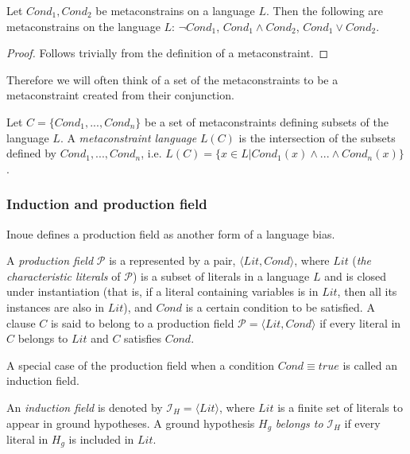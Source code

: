 \begin{proposition}
Let $Cond_1, Cond_2$ be metaconstrains on a language $L$.
Then the following are metaconstrains on the language $L$:
$\neg Cond_1$, $Cond_1 \land Cond_2$, $Cond_1 \lor Cond_2$.
\end{proposition}

\begin{proof}
Follows trivially from the definition of a metaconstraint.
\end{proof}

Therefore we will often think of a set of the metaconstraints to be a metaconstraint created from their conjunction.

\begin{defn}
Let $C=\{Cond_1, ..., Cond_n\}$ be a set of metaconstraints defining subsets of the language $L$.
A \emph{metaconstraint language} $L(C)$ is the intersection of the subsets defined by $Cond_1, ..., Cond_n$,
i.e. $L(C)=\{x \in L | Cond_1(x) \land ... \land Cond_n(x) \}$.
\end{defn}

\subsubsection{Induction and production field}
Inoue defines a production field as another form of a language bias.

\begin{defn}\cite{inoue2004induction}
A \emph{production field} $\mathcal{P}$ is a represented by a pair,
$\langle Lit, Cond\rangle$, where $Lit$
(\emph{the characteristic literals} of $\mathcal{P}$) is a subset of literals in a language $L$ and is closed under instantiation (that is, if a literal containing variables is in $Lit$, then all its instances are also in $Lit$), and $Cond$ is a certain condition to be satisfied. 
A clause $C$ is said to belong to a production field $\mathcal{P} = \langle Lit, Cond \rangle$ if every literal in $C$ belongs to $Lit$ and $C$ satisfies $Cond$.
\end{defn}

A special case of the production field when a condition $Cond \equiv true$ is called an induction field.

\begin{defn}\cite{yamamoto2012inverse}\label{induction_field_definition}
An \emph{induction field} is denoted by $\mathcal{I}_H = \langle Lit \rangle$,
where $Lit$ is a finite
set of literals to appear in ground hypotheses.
A ground hypothesis $H_g$ \emph{belongs to} $\mathcal{I}_H$ if
every literal in $H_g$ is included in $Lit$.
\end{defn}

